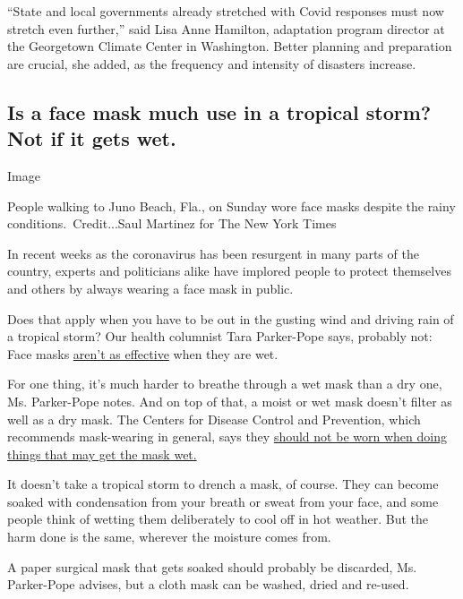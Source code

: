 ``State and local governments already stretched with Covid responses
must now stretch even further,'' said Lisa Anne Hamilton, adaptation
program director at the Georgetown Climate Center in Washington. Better
planning and preparation are crucial, she added, as the frequency and
intensity of disasters increase.

\hypertarget{is-a-face-mask-much-use-in-a-tropical-storm-not-if-it-gets-wet}{%
\subsection{Is a face mask much use in a tropical storm? Not if it gets
wet.}\label{is-a-face-mask-much-use-in-a-tropical-storm-not-if-it-gets-wet}}

Image

People walking to Juno Beach, Fla., on Sunday wore face masks despite
the rainy conditions.~Credit...Saul Martinez for The New York Times

In recent weeks as the coronavirus has been resurgent in many parts of
the country, experts and politicians alike have implored people to
protect themselves and others by always wearing a face mask in public.

Does that apply when you have to be out in the gusting wind and driving
rain of a tropical storm? Our health columnist Tara Parker-Pope says,
probably not: Face masks
\href{https://www.nursingtimes.net/clinical-archive/infection-control/the-effectiveness-of-surgical-face-masks-what-the-literature-shows-30-09-2003/}{aren't
as effective} when they are wet.

For one thing, it's much harder to breathe through a wet mask than a dry
one, Ms. Parker-Pope notes. And on top of that, a moist or wet mask
doesn't filter as well as a dry mask. The Centers for Disease Control
and Prevention, which recommends mask-wearing in general, says they
\href{https://www.cdc.gov/coronavirus/2019-ncov/prevent-getting-sick/cloth-face-cover-guidance.html}{should
not be worn when doing things that may get the mask wet.}

It doesn't take a tropical storm to drench a mask, of course. They can
become soaked with condensation from your breath or sweat from your
face, and some people think of wetting them deliberately to cool off in
hot weather. But the harm done is the same, wherever the moisture comes
from.

A paper surgical mask that gets soaked should probably be discarded, Ms.
Parker-Pope advises, but a cloth mask can be washed, dried and re-used.

